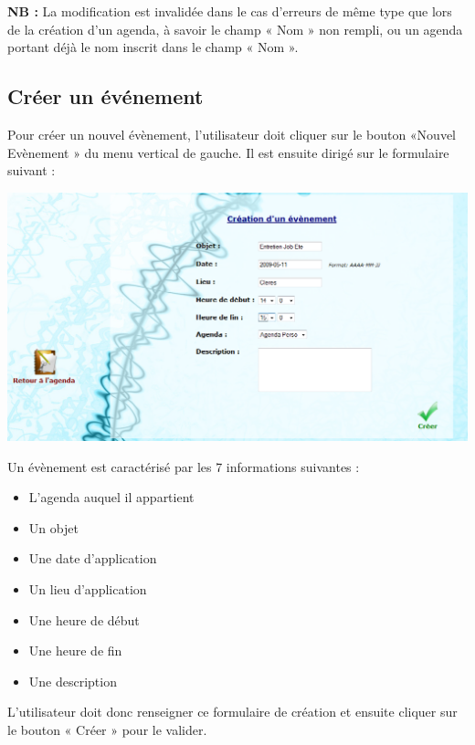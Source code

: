 \documentclass[12pt , a4paper]{article}
\begin{document}
\noindent \textbf{NB :} La modification est invalidée dans le cas d’erreurs de même type que lors de la création
d’un agenda, à savoir le champ « Nom » non rempli, ou un agenda portant déjà le nom inscrit
dans le champ « Nom ».



\subsection{Créer un événement}
\noindent Pour créer un nouvel évènement, l’utilisateur doit cliquer sur le bouton «Nouvel Evènement »
du menu vertical de gauche. Il est ensuite dirigé sur le formulaire suivant :
\begin{center}
  \includegraphics[scale=0.4]{./images/creation_event1.png}
\end{center}




Un évènement est caractérisé par les 7 informations suivantes :
\begin{itemize}
\item L’agenda auquel il appartient
\item Un objet
\item Une date d’application
\item Un lieu d’application
\item Une heure de début
\item Une heure de fin
\item Une description
\end{itemize}
         

\noindent L’utilisateur doit donc renseigner ce formulaire de création et ensuite cliquer sur le bouton
« Créer » pour le valider.
\end{document}
